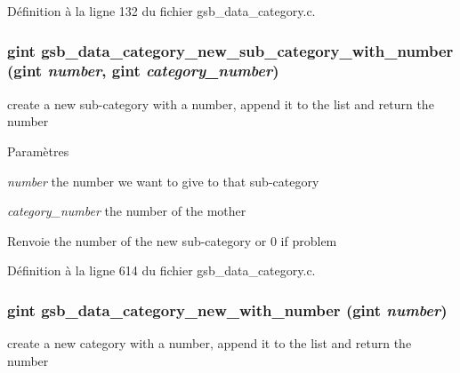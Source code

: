 Définition à la ligne 132 du fichier gsb\_\-data\_\-category.c.

\subsubsection[{gsb\_\-data\_\-category\_\-new\_\-sub\_\-category\_\-with\_\-number}]{\setlength{\rightskip}{0pt plus 5cm}gint gsb\_\-data\_\-category\_\-new\_\-sub\_\-category\_\-with\_\-number (gint {\em number}, \/  gint {\em category\_\-number})}\label{gsb__data__category_8c_a007e82a8aede52e25cabd4525cdd75af}
create a new sub-\/category with a number, append it to the list and return the number


\begin{DoxyParams}{Paramètres}
\item[{\em number}]the number we want to give to that sub-\/category \item[{\em category\_\-number}]the number of the mother\end{DoxyParams}
\begin{DoxyReturn}{Renvoie}
the number of the new sub-\/category or 0 if problem 
\end{DoxyReturn}


Définition à la ligne 614 du fichier gsb\_\-data\_\-category.c.

\subsubsection[{gsb\_\-data\_\-category\_\-new\_\-with\_\-number}]{\setlength{\rightskip}{0pt plus 5cm}gint gsb\_\-data\_\-category\_\-new\_\-with\_\-number (gint {\em number})}\label{gsb__data__category_8c_af1200f47ea735940d984eff24c5c41ef}
create a new category with a number, append it to the list and return the number


